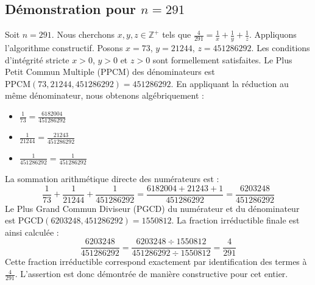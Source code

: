 \documentclass[11pt,a4paper]{article}
\begin{document}
\subsection{Démonstration pour $n = 291$}
Soit $n = 291$. Nous cherchons $x, y, z \in \mathbb{Z}^{+}$ tels que $\frac{4}{291} = \frac{1}{x} + \frac{1}{y} + \frac{1}{z}$.
Appliquons l'algorithme constructif. Posons $x = 73$, $y = 21244$, $z = 451286292$.
Les conditions d'intégrité stricte $x > 0$, $y > 0$ et $z > 0$ sont formellement satisfaites.
Le Plus Petit Commun Multiple (PPCM) des dénominateurs est $\text{PPCM}(73, 21244, 451286292) = 451286292$.
En appliquant la réduction au même dénominateur, nous obtenons algébriquement :
\begin{itemize}
    \item $\frac{1}{73} = \frac{6182004}{451286292}$
    \item $\frac{1}{21244} = \frac{21243}{451286292}$
    \item $\frac{1}{451286292} = \frac{1}{451286292}$
\end{itemize}
La sommation arithmétique directe des numérateurs est :
$$ \frac{1}{73} + \frac{1}{21244} + \frac{1}{451286292} = \frac{6182004 + 21243 + 1}{451286292} = \frac{6203248}{451286292} $$
Le Plus Grand Commun Diviseur (PGCD) du numérateur et du dénominateur est $\text{PGCD}(6203248, 451286292) = 1550812$.
La fraction irréductible finale est ainsi calculée :
$$ \frac{6203248}{451286292} = \frac{6203248 \div 1550812}{451286292 \div 1550812} = \frac{4}{291} $$
Cette fraction irréductible correspond exactement par identification des termes à $\frac{4}{291}$. L'assertion est donc démontrée de manière constructive pour cet entier.
\end{document}
